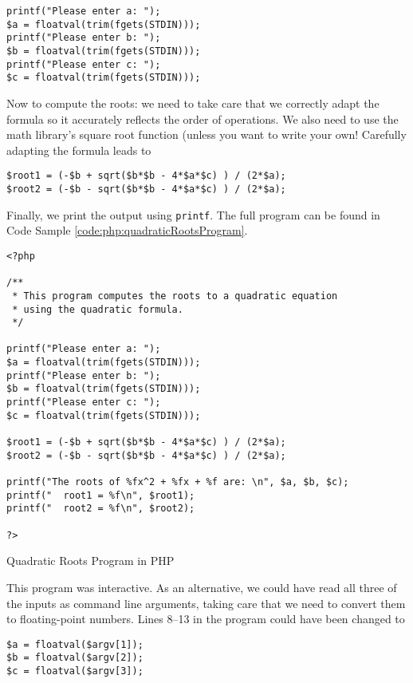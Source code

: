 \begin{verbatim}
printf("Please enter a: ");
$a = floatval(trim(fgets(STDIN)));
printf("Please enter b: ");
$b = floatval(trim(fgets(STDIN)));
printf("Please enter c: ");
$c = floatval(trim(fgets(STDIN)));
\end{verbatim}

Now to compute the roots: we need to take care that we correctly adapt the
formula so it accurately reflects the order of operations.  We also need to use
the math library's square root function (unless you want to write 
your own!  Carefully adapting the formula leads to 

\begin{verbatim}
$root1 = (-$b + sqrt($b*$b - 4*$a*$c) ) / (2*$a);
$root2 = (-$b - sqrt($b*$b - 4*$a*$c) ) / (2*$a);
\end{verbatim}

Finally, we print the output using \texttt{printf}.  The full program 
can be found in Code Sample \ref{code:php:quadraticRootsProgram}.

\begin{listing}[h]
\begin{verbatim}
<?php

/**
 * This program computes the roots to a quadratic equation
 * using the quadratic formula.
 */

printf("Please enter a: ");
$a = floatval(trim(fgets(STDIN)));
printf("Please enter b: ");
$b = floatval(trim(fgets(STDIN)));
printf("Please enter c: ");
$c = floatval(trim(fgets(STDIN)));

$root1 = (-$b + sqrt($b*$b - 4*$a*$c) ) / (2*$a);
$root2 = (-$b - sqrt($b*$b - 4*$a*$c) ) / (2*$a);

printf("The roots of %fx^2 + %fx + %f are: \n", $a, $b, $c);
printf("  root1 = %f\n", $root1);
printf("  root2 = %f\n", $root2);

?>
\end{verbatim}
\caption{Quadratic Roots Program in PHP}
\label{code:php:quadraticRootsProgram}
\end{listing}

This program was interactive.  As an alternative, we could have read 
all three of the inputs as command line arguments, taking care that we
need to convert them to floating-point numbers.  Lines 8--13 in the
program could have been changed to 

\begin{verbatim}
$a = floatval($argv[1]);
$b = floatval($argv[2]);
$c = floatval($argv[3]);
\end{verbatim}

